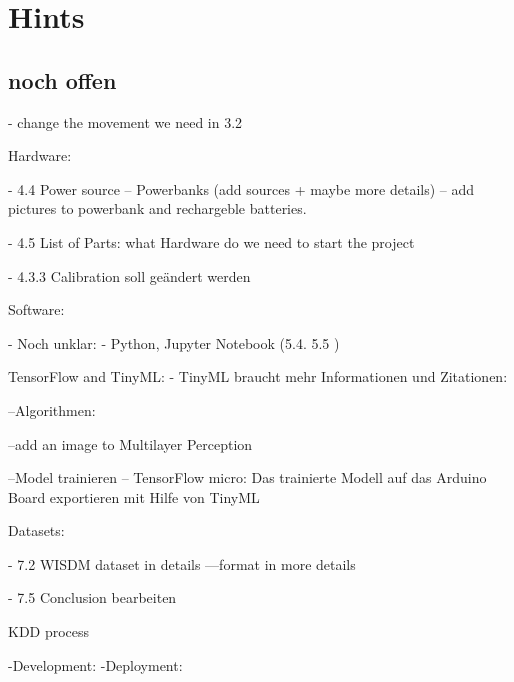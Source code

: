 %
%
%



\chapter{Hints}
\section{noch offen}

- change the movement we need in 3.2

Hardware: 

- 4.4 Power source
-- Powerbanks (add sources + maybe more details)
-- add pictures to powerbank and rechargeble batteries.

- 4.5 List of Parts: what Hardware do we need to start the project 

- 4.3.3 Calibration soll geändert werden 

Software: 

- Noch unklar: 
- Python, Jupyter Notebook  (5.4. 5.5 )


TensorFlow and TinyML: 
- TinyML braucht mehr Informationen und Zitationen:


--Algorithmen:

--add an image to Multilayer Perception


--Model trainieren 
-- TensorFlow micro: Das trainierte Modell auf das Arduino Board exportieren mit Hilfe von TinyML



Datasets: 

- 7.2 WISDM dataset in details 
---format in more details 

- 7.5 Conclusion bearbeiten 

KDD process 

-Development: 
-Deployment: 



%
%
%
%
%
%
%
%
%
%
